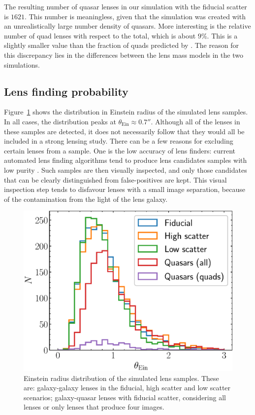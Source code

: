 \documentclass{aa}
\def\tein{\theta_{\mathrm{Ein}}}
\def\Fref#1{Figure~\ref{#1}\xspace}
\begin{document}
The resulting number of quasar lenses in our simulation with the fiducial scatter is $1621$. This number is meaningless, given that the simulation was created with an unrealistically large number density of quasars.
More interesting is the relative number of quad lenses with respect to the total, which is about $9\%$. This is a slightly smaller value than the fraction of quads predicted by \citet{O+M10}.
The reason for this discrepancy lies in the differences between the lens mass models in the two simulations.


\subsection{Lens finding probability}\label{ssec:teincuts}

\Fref{fig:teinhist} shows the distribution in Einstein radius of the simulated lens samples.
In all cases, the distribution peaks at $\tein\approx0.7''$.
Although all of the lenses in these samples are detected, it does not necessarily follow that they would all be included in a strong lensing study.
There can be a few reasons for excluding certain lenses from a sample. 
One is the low accuracy of lens finders: current automated lens finding algorithms tend to produce lens candidates samples with low purity \citep[see e.g.][]{Son++18a,Pet++19,Sav++22}. Such samples are then visually inspected, and only those candidates that can be clearly distinguished from false-positives are kept. This visual inspection step tends to disfavour lenses with a small image separation, because of the contamination from the light of the lens galaxy.
\begin{figure}
\includegraphics[width=\columnwidth]{tein_hist.eps}
\caption{
Einstein radius distribution of the simulated lens samples.
These are: galaxy-galaxy lenses in the fiducial, high scatter and low scatter scenarios; galaxy-quasar lenses with fiducial scatter, considering all lenses or only lenses that produce four images.
\label{fig:teinhist}
}
\end{figure}
\end{document}

